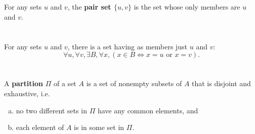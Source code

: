 \documentclass{report}
\begin{document}
\begin{definition}


\end{definition}

\section{}%

For any sets $u$ and $v$, the \textbf{pair set $\{u, v\}$} is the set whose
  only members are $u$ and $v$.

\begin{definition}

  \statementpadding



\end{definition}

\section{}%

For any sets $u$ and $v$, there is a set having as members just $u$ and $v$:
  $$\forall u, \forall v, \exists B, \forall x,
      (x \in B \iff x = u \text{ or } x = v).$$

\begin{axiom}

  \statementpadding



\end{axiom}

\section{}%

A \textbf{partition} $\Pi$ of a set $A$ is a set of nonempty subsets of $A$ that
  is disjoint and exhaustive, i.e.
  \begin{enumerate}[(a)]
    \item no two different sets in $\Pi$ have any common elements, and
    \item each element of $A$ is in some set in $\Pi$.
  \end{enumerate}
\end{document}

